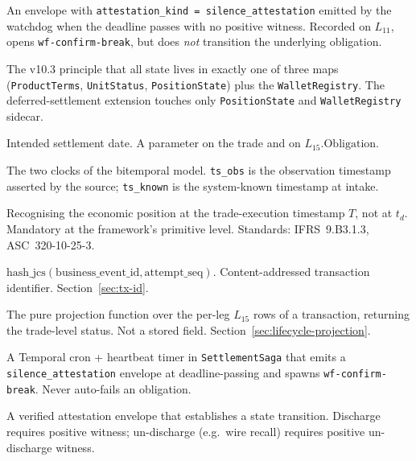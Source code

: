 \documentclass[11pt,a4paper]{article}
\begin{document}
\begin{description}[style=nextline,leftmargin=1.5em]
\item[\texttt{silence\_attestation}] An envelope with \texttt{attestation\_kind = silence\_attestation} emitted by the watchdog when the deadline passes with no positive witness. Recorded on $L_{11}$, opens \texttt{wf-confirm-break}, but does \emph{not} transition the underlying obligation.

\item[StatesHome] The v10.3 principle that all state lives in exactly one of three maps (\texttt{ProductTerms}, \texttt{UnitStatus}, \texttt{PositionState}) plus the \texttt{WalletRegistry}. The deferred-settlement extension touches only \texttt{PositionState} and \texttt{WalletRegistry} sidecar.

\item[$t_d$] Intended settlement date. A parameter on the trade and on $L_{15}.\mathrm{Obligation}$.

\item[$t_{\mathrm{obs}}$ / $t_{\mathrm{known}}$] The two clocks of the bitemporal model. \texttt{ts\_obs} is the observation timestamp asserted by the source; \texttt{ts\_known} is the system-known timestamp at intake.

\item[Trade-date accounting] Recognising the economic position at the trade-execution timestamp $T$, not at $t_d$. Mandatory at the framework's primitive level. Standards: IFRS~9.B3.1.3, ASC~320-10-25-3.

\item[$\mathrm{tx\_id}$] $\mathrm{hash\_jcs}(\mathrm{business\_event\_id}, \mathrm{attempt\_seq})$. Content-addressed transaction identifier. Section~\ref{sec:tx-id}.

\item[\texttt{tx\_status}(tx)] The pure projection function over the per-leg $L_{15}$ rows of a transaction, returning the trade-level status. Not a stored field. Section~\ref{sec:lifecycle-projection}.

\item[Watchdog] A Temporal cron + heartbeat timer in \texttt{SettlementSaga} that emits a \texttt{silence\_attestation} envelope at deadline-passing and spawns \texttt{wf-confirm-break}. Never auto-fails an obligation.

\item[Witness] A verified attestation envelope that establishes a state transition. Discharge requires positive witness; un-discharge (e.g.\ wire recall) requires positive un-discharge witness.

\end{description}
\end{document}
